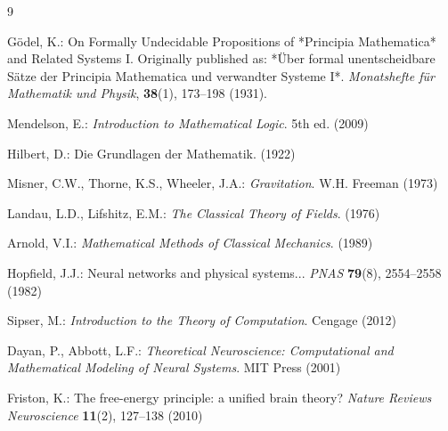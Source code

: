 \documentclass[runningheads]{llncs}
\begin{document}

\begin{thebibliography}{9}

Gödel, K.: On Formally Undecidable Propositions of *Principia Mathematica* and Related Systems I.  
Originally published as: *Über formal unentscheidbare Sätze der Principia Mathematica und verwandter Systeme I*. \textit{Monatshefte für Mathematik und Physik}, \textbf{38}(1), 173–198 (1931).

Mendelson, E.: \textit{Introduction to Mathematical Logic}. 5th ed. (2009)

Hilbert, D.: Die Grundlagen der Mathematik. (1922)

Misner, C.W., Thorne, K.S., Wheeler, J.A.: \textit{Gravitation}. W.H. Freeman (1973)

Landau, L.D., Lifshitz, E.M.: \textit{The Classical Theory of Fields}. (1976)

Arnold, V.I.: \textit{Mathematical Methods of Classical Mechanics}. (1989)

Hopfield, J.J.: Neural networks and physical systems... \textit{PNAS} \textbf{79}(8), 2554–2558 (1982)

Sipser, M.: \textit{Introduction to the Theory of Computation}. Cengage (2012)

Dayan, P., Abbott, L.F.: \textit{Theoretical Neuroscience: Computational and Mathematical Modeling of Neural Systems}. MIT Press (2001)

Friston, K.: The free-energy principle: a unified brain theory? \textit{Nature Reviews Neuroscience} \textbf{11}(2), 127--138 (2010)

\end{thebibliography}
\end{document}
